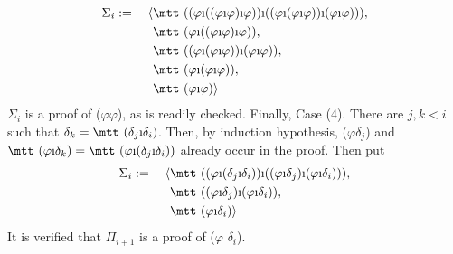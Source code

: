 \begin{align}
\Sigma_i := \quad \auf &
\mbox{\mtt (($\varphi$\symbol{25}(($\varphi$\symbol{25}$\varphi$%
)\symbol{25}$\varphi$))\symbol{25}(($\varphi$\symbol{25}(%
$\varphi$\symbol{25}$\varphi$))\symbol{25}($\varphi$\symbol{25}%
$\varphi$)))}, \\\notag
&
    \mbox{\mtt ($\varphi$\symbol{25}(($\varphi$\symbol{25}$\varphi$%
)\symbol{25}$\varphi$))}, \\\notag
&
    \mbox{\mtt (($\varphi$\symbol{25}($\varphi$\symbol{25}$\varphi$))%
\symbol{25}($\varphi$\symbol{25}$\varphi$))}, \\\notag
&
    \mbox{\mtt ($\varphi$\symbol{25}($\varphi$\symbol{25}%
$\varphi$))}, \\\notag
&
    \mbox{\mtt ($\varphi$\symbol{25}$\varphi$)}\zu
\end{align}
$\Sigma_i$ is a proof of {\mtt ($\varphi$$\varphi$)},
as is readily checked. Finally, Case (4). There are $j, k < i$ such
that $\delta_k = \mbox{\mtt ($\delta_j$\symbol{25}$\delta_i$)}$.
Then, by induction hypothesis, {\mtt ($\varphi$$\delta_j$)}
and $\mbox{\mtt ($\varphi$\symbol{25}$\delta_k$)} =
\mbox{\mtt ($\varphi$\symbol{25}($\delta_j$\symbol{25}$\delta_i$))}$
already occur in the proof. Then put
\begin{align}
\Sigma_i := \quad \auf &
\mbox{\mtt (($\varphi$\symbol{25}($\delta_j$\symbol{25}$\delta_i$))%
\symbol{25}(($\varphi$\symbol{25}$\delta_j$)\symbol{25}($\varphi$%
\symbol{25}$\delta_i$)))}, \\\notag
&
    \mbox{\mtt (($\varphi$\symbol{25}$\delta_j$)\symbol{25}(%
$\varphi$\symbol{25}$\delta_i$))}, \\\notag
&
    \mbox{\mtt ($\varphi$\symbol{25}$\delta_i$)}
    \zu
\end{align}
It is verified that $\Pi_{i+1}$ is a proof of {\mtt ($\varphi$%
$\delta_i$)}.
\proofend

